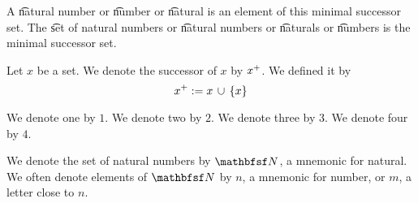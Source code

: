 A \t{natural number} or \t{number} or \t{natural} is an element of this minimal successor set.
The \t{set of natural numbers} or \t{natural numbers} or \t{naturals} or \t{numbers} is the minimal successor set.

%
%
%


Let $x$ be a set.
We denote the successor of $x$ by ${x}^{+}$.
We defined it by
$$
  {x}^{+} := x \,\cup\, \{x\}
$$

We denote one by $1$.
We denote two by $2$.
We denote three by $3$.
We denote four by $4$.

We denote the set of natural numbers by $\N$, a mnemonic for natural.
We often denote elements of $\N$ by $n$, a mnemonic for number, or $m$, a letter close to $n$.
\strats
